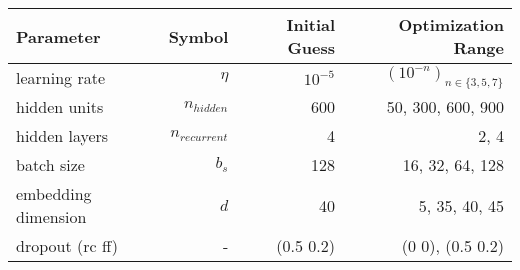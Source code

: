 \documentclass[convert={outext=.svg,command=\unexpanded{pdf2svg \infile\space\outfile}},multi=false,border={1cm 1cm 1cm 1cm}]{standalone}
\begin{document}
    \begin{tabularx}{1.03\textwidth}{lrrr}
        Parameter & Symbol & Initial Guess & Optimization Range    \tabularnewline
        \midrule
        learning rate & $\eta$          & $10^{-5}$     & $(10^{-n})_{n \in \{3,5,7\}}$  \tabularnewline
        \midrule
        hidden units & $n_{hidden}$    & 600 & 50, 300, 600, 900 \tabularnewline
        \midrule
        hidden layers & $n_{recurrent}$ & 4 & 2, 4 \tabularnewline
        \midrule
        batch size & $b_s$           & 128 & 16, 32, 64, 128  \tabularnewline
        \midrule
        embedding dimension & $d$             & 40 & 5, 35, 40, 45 \tabularnewline
        \midrule
        dropout (rc ff) & - & (0.5 0.2)     & (0 0), (0.5 0.2) \tabularnewline
        \midrule
    \end{tabularx}
\end{document}
